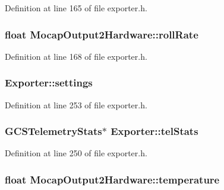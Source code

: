 \-Definition at line 165 of file exporter.\-h.

\hypertarget{group___mo_cap_plugin_ga178bcd8c81449eb7c9cc5c5bb203e591}{
\subsubsection[{roll\-Rate}]{\setlength{\rightskip}{0pt plus 5cm}float {\bf \-Mocap\-Output2\-Hardware\-::roll\-Rate}}}\label{group___mo_cap_plugin_ga178bcd8c81449eb7c9cc5c5bb203e591}


\-Definition at line 168 of file exporter.\-h.

\hypertarget{group___mo_cap_plugin_ga50484fe9f9410948c133b1c589f73f76}{
\subsubsection[{settings}]{ {\bf \-Exporter\-::settings}}}\label{group___mo_cap_plugin_ga50484fe9f9410948c133b1c589f73f76}


\-Definition at line 253 of file exporter.\-h.

\hypertarget{group___mo_cap_plugin_gad3a5a6122f88f8f4b44847053a7d830b}{
\subsubsection[{tel\-Stats}]{\setlength{\rightskip}{0pt plus 5cm}\-G\-C\-S\-Telemetry\-Stats$\ast$ {\bf \-Exporter\-::tel\-Stats}}}\label{group___mo_cap_plugin_gad3a5a6122f88f8f4b44847053a7d830b}


\-Definition at line 250 of file exporter.\-h.

\hypertarget{group___mo_cap_plugin_gaa66ae80cf0902b622dea302a9a588fe8}{
\subsubsection[{temperature}]{\setlength{\rightskip}{0pt plus 5cm}float {\bf \-Mocap\-Output2\-Hardware\-::temperature}}}\label{group___mo_cap_plugin_gaa66ae80cf0902b622dea302a9a588fe8}


